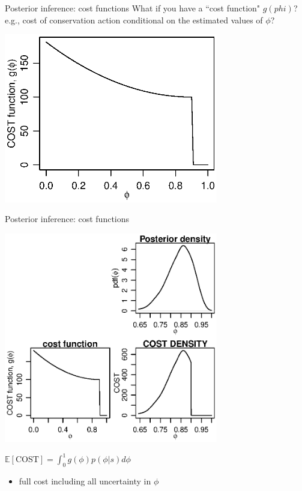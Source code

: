 \documentclass[presentation,9pt,xcolor=dvipsnames]{beamer}
\begin{document}
\begin{frame}[label={sec:orgf07d9c8}]{Posterior inference: cost functions}
What if you have a ``cost function" \(g(phi)\)?
e.g., cost of conservation action conditional on the estimated values of \(\phi\)?
\begin{center}
\includegraphics[width=0.7\textwidth,height=0.7\textheight]{surv_cost_func.eps}
\end{center}
\end{frame}
\begin{frame}[label={sec:org033ef5e}]{Posterior inference: cost functions}
\begin{center}
\includegraphics[width=0.7\textwidth,height=0.7\textheight]{surv_cost_est.eps}
\end{center}
\(\mathbb{E}[\text{COST}] = \int_0^1g(\phi)p(\phi\vert s)d\phi\)
\begin{itemize}
\item full cost including all uncertainty in \(\phi\)
\end{itemize}
\end{frame}
\end{document}
